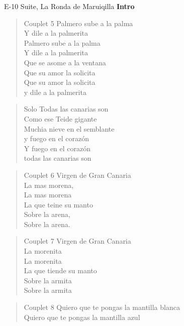 \begin{song}[vals]{E-10 Suite, La Ronda de Maruiqilla}
\textbf{Intro}\\

\clearpage
\begin{verse}{Couplet 5}
Palmero sube a la palma\\
Y dile a la palmerita\\
Palmero sube a la palma\\
Y dile a la palmerita\\
Que se asome a la ventana\\
Que su amor la solicita\\
Que su amor la solicita\\
y dile a la palmerita\\
\end{verse}
\begin{verse}{Solo}
Todas las canarias son\\
Como ese Teide gigante\\
Muchia nieve en el semblante\\
y fuego en el corazón\\
Y fuego en el corazón\\
todas las canarias son\\
\end{verse}
\clearpage
\begin{verse}{Couplet 6}
Virgen de Gran Canaria\\
\chord{}La mas morena,\\
La mas morena\\
La que teine su manto\\
\chord{}Sobre la arena,\\
Sobre la arena.\
\end{verse}
\begin{verse}{Couplet 7}
Virgen de Gran Canaria\\
\chord{}La morenita\\
La morenita\\
La que tiende su manto\\
\chord{}Sobre la armita\\
Sobre la armita\\
\end{verse}
\begin{verse}{Couplet 8}
\chord{}Quiero que te pongas la mantilla blanca\\
Quiero que te pongas la mantilla azul\\

\end{verse}
\end{song}
